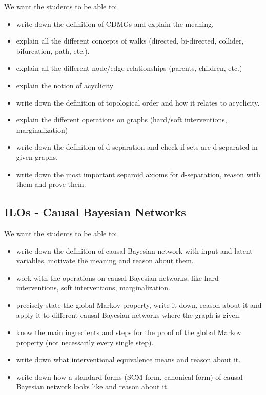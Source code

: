 We want the students to be able to:
\begin{itemize}
\item write down the definition of CDMGs and explain the meaning.
\item explain all the different concepts of walks (directed, bi-directed, collider, bifurcation, path, etc.).
\item explain all the different node/edge relationships (parents, children, etc.)
\item explain the notion of acyclicity
\item write down the definition of topological order and how it relates to acyclicity.
\item explain the different operations on graphs (hard/soft interventions, marginalization)
\item write down the definition of d-separation and check if sets are d-separated in given graphs.
\item write down the most important separoid axioms for d-separation, reason with them and prove them.
\end{itemize}


\subsection*{ILOs - Causal Bayesian Networks}

We want the students to be able to:
\begin{itemize}
\item write down the definition of causal Bayesian network with input and latent variables, motivate the meaning and reason about them.
\item work with the operations on causal Bayesian networks, like hard interventions, soft interventions, marginalization.
\item precisely state the global Markov property, write it down, reason about it and apply it to different causal Bayesian networks where the graph is given.
\item know the main ingredients and steps for the proof of the global Markov property (not necessarily every single step).
\item write down what interventional equivalence means and reason about it.
\item write down how a standard forms (SCM form, canonical form) of causal Bayesian network looks like and reason about it.
\end{itemize}


